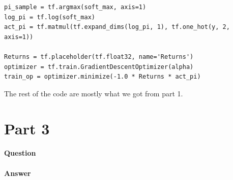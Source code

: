 \documentclass[11pt,twoside]{article}
\begin{document}
\begin{enumerate}
\begin{lstlisting}
pi_sample = tf.argmax(soft_max, axis=1)
log_pi = tf.log(soft_max)
act_pi = tf.matmul(tf.expand_dims(log_pi, 1), tf.one_hot(y, 2, axis=1))

Returns = tf.placeholder(tf.float32, name='Returns')
optimizer = tf.train.GradientDescentOptimizer(alpha)
train_op = optimizer.minimize(-1.0 * Returns * act_pi)
\end{lstlisting}

The rest of the code are mostly what we got from part 1.

\end{enumerate}

\clearpage



\section*{Part 3}

\paragraph{Question}

\paragraph{Answer}

\clearpage
\end{document}
